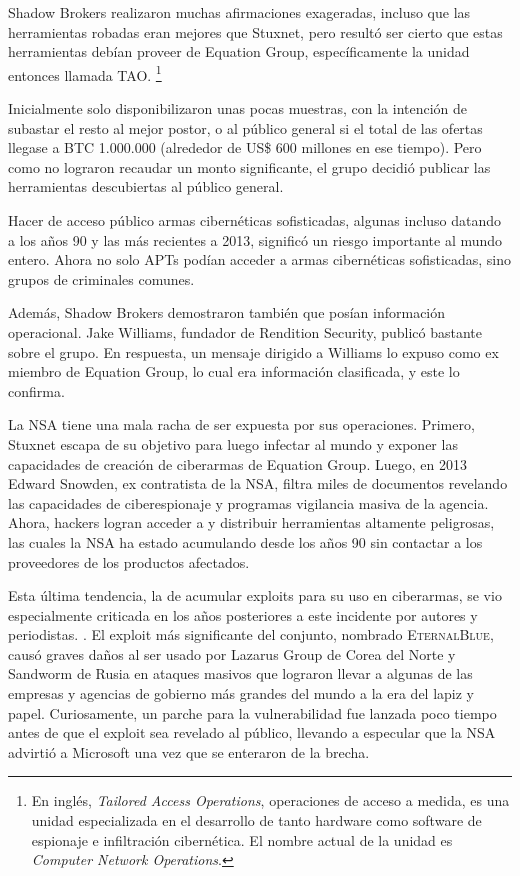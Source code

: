 \documentclass{article}
\begin{document}
Shadow Brokers realizaron muchas afirmaciones exageradas, incluso que las herramientas robadas eran mejores que Stuxnet, pero resultó ser cierto que estas herramientas debían proveer de Equation Group, específicamente la unidad entonces llamada TAO. \footnote{En inglés, {\it Tailored Access Operations}, operaciones de acceso a medida, es una unidad especializada en el desarrollo de tanto hardware como software de espionaje e infiltración cibernética. El nombre actual de la unidad es {\it Computer Network Operations}.} \autocite{sophos-shadow-brokers}

Inicialmente solo disponibilizaron unas pocas muestras, con la intención de subastar el resto al mejor postor, o al público general si el total de las ofertas llegase a BTC 1.000.000 (alrededor de US\$ 600 millones en ese tiempo). Pero como no lograron recaudar un monto significante, el grupo decidió publicar las herramientas descubiertas al público general.

Hacer de acceso público armas cibernéticas sofisticadas, algunas incluso datando a los años 90 y las más recientes a 2013, significó un riesgo importante al mundo entero. Ahora no solo APTs podían acceder a armas cibernéticas sofisticadas, sino grupos de criminales comunes.

Además, Shadow Brokers demostraron también que posían información operacional. Jake Williams, fundador de Rendition Security, publicó bastante sobre el grupo. En respuesta, un mensaje dirigido a Williams lo expuso como ex miembro de Equation Group, lo cual era información clasificada, y este lo confirma. \autocite{nytimes-shadow-brokers} \autocite{darknetdiaries-shadow-brokers}

La NSA tiene una mala racha de ser expuesta por sus operaciones. Primero, Stuxnet escapa de su objetivo para luego infectar al mundo y exponer las capacidades de creación de ciberarmas de Equation Group. Luego, en 2013 Edward Snowden, ex contratista de la NSA, filtra miles de documentos revelando las capacidades de ciberespionaje y programas vigilancia masiva de la agencia. Ahora, hackers logran acceder a y distribuir herramientas altamente peligrosas, las cuales la NSA ha estado acumulando desde los años 90 sin contactar a los proveedores de los productos afectados.

Esta última tendencia, la de acumular exploits para su uso en ciberarmas, se vio especialmente criticada en los años posteriores a este incidente por autores y periodistas. \autocite{schneier-shadow-brokers}. El exploit más significante del conjunto, nombrado \textsc{EternalBlue}, causó graves daños al ser usado por Lazarus Group de Corea del Norte y Sandworm de Rusia en ataques masivos que lograron llevar a algunas de las empresas y agencias de gobierno más grandes del mundo a la era del lapiz y papel. Curiosamente, un parche para la vulnerabilidad fue lanzada poco tiempo antes de que el exploit sea revelado al público, llevando a especular que la NSA advirtió a Microsoft una vez que se enteraron de la brecha.
\end{document}
